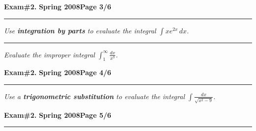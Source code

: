 \documentclass[12pt]{article}
\begin{document}
\hfill{\large\bf Exam\#2.}\hfill{\large\bf
  Spring 2008}\hfill{\large\bf Page 3/6}\hrule

\bigskip
{\problem[10 pts] \em Use \textbf{integration by parts} to evaluate the integral $\displaystyle{\int xe^{2x}\, dx}$.}
\vspace{6cm}
\begin{flushright}
\end{flushright}
\hrule
{\problem[10 pts] \em Evaluate the improper integral $\displaystyle{\int_1^\infty \frac{dx}{x^3}}$.}
\vspace{10cm}
\begin{flushright}
\end{flushright}
\newpage

\hfill{\large\bf Exam\#2.}\hfill{\large\bf
  Spring 2008}\hfill{\large\bf Page 4/6}\hrule

\bigskip
{\problem[10 pts] \em Use a \textbf{trigonometric substitution} to evaluate the integral $\displaystyle{\int \frac{dx}{\sqrt{x^2-9}}}$.}
\vspace{18cm}
\begin{flushright}
\end{flushright}
\newpage

\hfill{\large\bf Exam\#2.}\hfill{\large\bf
  Spring 2008}\hfill{\large\bf Page 5/6}\hrule
\end{document}
